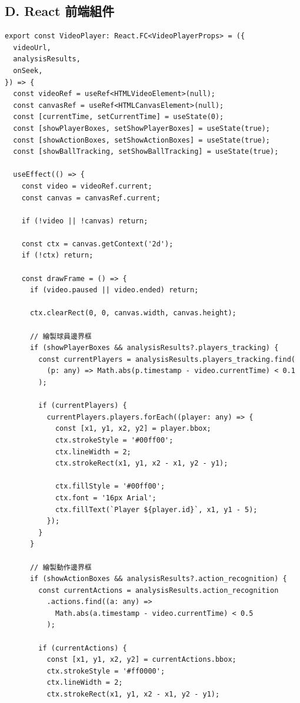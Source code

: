 \documentclass[a4paper,14pt,oneside]{article}
\begin{document}
\subsection*{D. React 前端組件}

\begin{lstlisting}[style=jsstyle, caption={VideoPlayer 互動式播放器組件}]
export const VideoPlayer: React.FC<VideoPlayerProps> = ({
  videoUrl,
  analysisResults,
  onSeek,
}) => {
  const videoRef = useRef<HTMLVideoElement>(null);
  const canvasRef = useRef<HTMLCanvasElement>(null);
  const [currentTime, setCurrentTime] = useState(0);
  const [showPlayerBoxes, setShowPlayerBoxes] = useState(true);
  const [showActionBoxes, setShowActionBoxes] = useState(true);
  const [showBallTracking, setShowBallTracking] = useState(true);

  useEffect(() => {
    const video = videoRef.current;
    const canvas = canvasRef.current;
    
    if (!video || !canvas) return;

    const ctx = canvas.getContext('2d');
    if (!ctx) return;

    const drawFrame = () => {
      if (video.paused || video.ended) return;

      ctx.clearRect(0, 0, canvas.width, canvas.height);

      // 繪製球員邊界框
      if (showPlayerBoxes && analysisResults?.players_tracking) {
        const currentPlayers = analysisResults.players_tracking.find(
          (p: any) => Math.abs(p.timestamp - video.currentTime) < 0.1
        );
        
        if (currentPlayers) {
          currentPlayers.players.forEach((player: any) => {
            const [x1, y1, x2, y2] = player.bbox;
            ctx.strokeStyle = '#00ff00';
            ctx.lineWidth = 2;
            ctx.strokeRect(x1, y1, x2 - x1, y2 - y1);
            
            ctx.fillStyle = '#00ff00';
            ctx.font = '16px Arial';
            ctx.fillText(`Player ${player.id}`, x1, y1 - 5);
          });
        }
      }

      // 繪製動作邊界框
      if (showActionBoxes && analysisResults?.action_recognition) {
        const currentActions = analysisResults.action_recognition
          .actions.find((a: any) => 
            Math.abs(a.timestamp - video.currentTime) < 0.5
          );
        
        if (currentActions) {
          const [x1, y1, x2, y2] = currentActions.bbox;
          ctx.strokeStyle = '#ff0000';
          ctx.lineWidth = 2;
          ctx.strokeRect(x1, y1, x2 - x1, y2 - y1);
          

\end{lstlisting}
\end{document}
